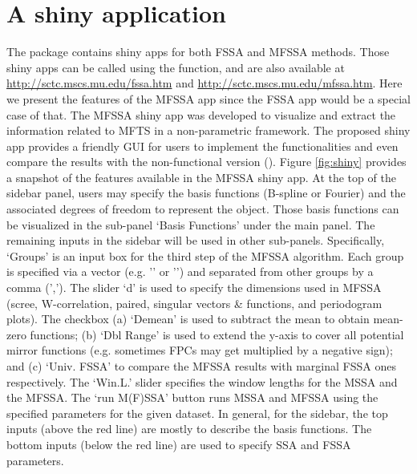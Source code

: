 \section{A shiny application}
The  package contains shiny apps for both FSSA and MFSSA methods. Those shiny apps can be called using the  function, and are also available at \url{http://sctc.mscs.mu.edu/fssa.htm} and \url{http://sctc.mscs.mu.edu/mfssa.htm}. Here we present the features of the MFSSA app since the FSSA app would be a special case of that. The MFSSA shiny app was developed to visualize and extract the information related to MFTS in a non-parametric framework. The proposed shiny app provides a friendly GUI for users to implement the  functionalities and even compare the results with the non-functional version ().
Figure \ref{fig:shiny} provides a snapshot of the features available in the MFSSA shiny app. At the top of the sidebar panel, users may specify the basis functions (B-spline or Fourier) and the associated degrees of freedom to represent the  object. Those basis functions can be visualized in the sub-panel \textsf{`Basis Functions'} under the main panel. The remaining inputs in the sidebar will be used in other sub-panels. Specifically, `Groups' is an input box for the third step of the MFSSA algorithm. Each group is specified via a vector (e.g. '' or '') and separated from other groups by a comma (','). The slider `d' is used to specify the dimensions used in MFSSA (scree, W-correlation, paired, singular vectors \& functions, and periodogram plots). The checkbox (a) `Demean' is used to subtract the mean to obtain mean-zero functions; (b) `Dbl Range' is used to extend the y-axis to cover all potential mirror functions (e.g. sometimes FPCs may get multiplied by a negative sign); and (c) `Univ. FSSA' to compare the MFSSA results with marginal FSSA ones respectively. The `Win.L.' slider specifies the window lengths for the MSSA and the MFSSA. The `run M(F)SSA' button runs MSSA and MFSSA using the specified parameters for the given dataset. In general, for the sidebar, the top inputs (above the red line) are mostly to describe the basis functions. The bottom inputs (below the red line) are used to specify SSA and FSSA parameters.
